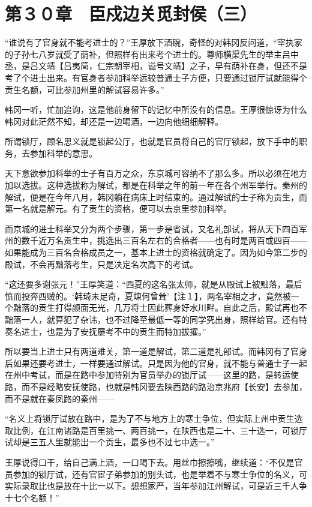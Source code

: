 \section{第３０章　臣戍边关觅封侯（三）}

“谁说有了官身就不能考进士的？”王厚放下酒碗，奇怪的对韩冈反问道，“宰执家的子孙七八岁就受了荫补，但照样有出来考个进士的。尊师横渠先生的举主吕中丞，是吕文靖【吕夷简，仁宗朝宰相，谥号文靖】之子，早有荫补在身，但还不是考了个进士出来。有官身者参加科举远较普通士子方便，只要通过锁厅试就能得个贡生名额，可比参加州里的解试容易许多。”

韩冈一听，忙加追询，这是他前身留下的记忆中所没有的信息。王厚很惊讶为什么韩冈对此茫然不知，却还是一边喝酒，一边向他细细解释。

所谓锁厅，顾名思义就是锁起公厅，也就是官员将自己的官厅锁起，放下手中的职务，去参加科举的意思。

天下意欲参加科举的士子有百万之众，东京城可容纳不了那么多。所以必须在地方加以选拔。这种选拔称为解试，都是在科举之年的前一年在各个州军举行。秦州的解试，便是在今年八月，韩冈躺在病床上时结束的。通过解试的士子称为贡生，而第一名就是解元。有了贡生的资格，便可以去京里参加科举。

而京城的进士科举又分为两个步骤，第一步是省试，又名礼部试，将从天下四百军州的数千近万名贡生中，挑选出三百名左右的合格者——也有时是两百或四百——如果能成为三百名合格成员之一，基本上进士的资格就确定了。因为如今第二步的殿试，不会再黜落考生，只是决定名次高下的考试。

“这还要多谢张元！”王厚笑道：“西夏的这名张太师，就是从殿试上被黜落，最后愤而投奔西贼的。‘韩琦未足奇，夏竦何曾耸’【注１】，两名宰相之才，竟然被一个黜落的贡生打得颜面无光，几万将士因此葬身好水川畔。自此之后，殿试再也不黜落一人，就算犯了杂讳，也不过降至最低一等的同学究出身，照样给官。还有特奏名进士，也是为了安抚屡考不中的贡生而特加拔擢。”

所以要当上进士只有两道难关，第一道是解试，第二道是礼部试。而韩冈有了官身后如果还要考进士，一样要通过解试。只是因为他的官身，就不能与普通士子一起在州中考试，而是在路中参加特别为官员举办的锁厅试——这里的路，是转运使路，而不是经略安抚使路，也就是韩冈要去陕西路的路治京兆府【长安】去参加，而不是就在秦凤路的秦州——

“名义上将锁厅试放在路中，是为了不与地方上的寒士争位，但实际上州中贡生选取比例，在江南诸路是百里挑一、两百挑一，在陕西也是二十、三十选一，可锁厅试却是三五人里就能出一个贡生，最多也不过七中选一。”

王厚说得口干，给自己满上酒，一口喝下去。用丝巾擦擦嘴，继续道：“不仅是官员参加的锁厅试，还有官宦子弟参加的别头试，也是举着不与寒士争位的名义，可实际录取比也是放在十比一以下。想想家严，当年参加江州解试，可是近三千人争十七个名额！”


